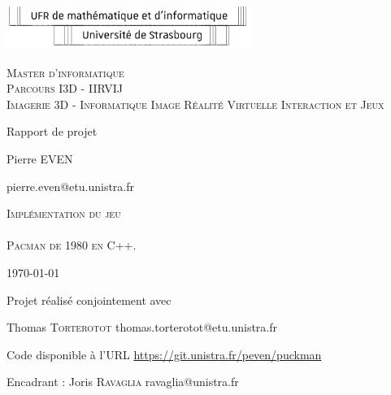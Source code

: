 \documentclass [twoside,a4paper,11pt,french] {report}
\begin{document}

\begin{center}
    \includegraphics [width=8cm] {logo-ufr.pdf}       

    \vfill

    {
	\large
	\textsc{
	    Master d'informatique \\
	    Parcours I3D - IIRVIJ \\
		Imagerie 3D - Informatique Image Réalité Virtuelle Interaction et Jeux
	}
    }

    \bigskip\bigskip
    \bigskip\bigskip

    {\huge Rapport de projet}

    \bigskip\bigskip

    {\large Pierre \textsc{EVEN}}

    {\small pierre.even@etu.unistra.fr}

    
    \vfill

    {
	\huge
	\textsc{
		Implémentation du jeu \\
	    ~ \\
        Pacman de 1980 en C++.
	}
    }

    \vfill
    \vfill

    \today

    \vfill

    {\large Projet réalisé conjointement avec}

    \medskip

    {
		\large Thomas \textsc{Torterotot} \small{thomas.torterotot@etu.unistra.fr}
	}

    \vfill

    {\large Code disponible à l'URL \url{https://git.unistra.fr/peven/puckman}}

    \medskip

    {
		Encadrant : \large Joris \textsc{Ravaglia} \small{ravaglia@unistra.fr}
	}
    \bigskip

    \bigskip
\end{center}

\end{document}
